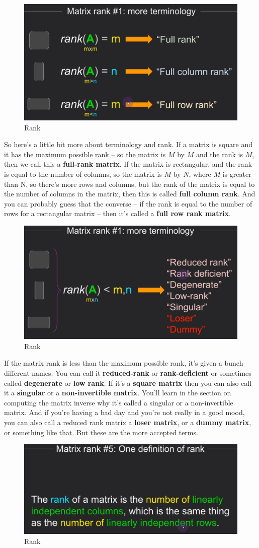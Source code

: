 \documentclass[fleqn,10pt]{olplainarticle}
\theoremstyle{definition}
\theoremstyle{remark}
\begin{document}
\pagebreak

\begin{figure}[ht]
	\centering
	\includegraphics[width=0.4\linewidth]{images/rank-09.png}
	\caption{Rank}
	\label{fig:rank_09}
\end{figure}

So here's a little bit more about terminology and rank. If a matrix is square and it has the maximum possible rank -- so the matrix is $M$ by $M$ and the rank is $M$, then we call this a \textbf{full-rank matrix}. If the matrix is rectangular, and the rank is equal to the number of columns, so the matrix is $M$ by $N$, where $M$ is greater than N, so there's more rows and columns, but the rank of the matrix is equal to the number of columns in the matrix, then this is called \textbf{full column rank}. And you can probably guess that the converse -- if the rank is equal to the number of rows for a rectangular matrix -- then it's called a \textbf{full row rank matrix}.

\begin{figure}[ht]
	\centering
	\includegraphics[width=0.3\linewidth]{images/rank-10.png}
	\caption{Rank}
	\label{fig:rank_10}
\end{figure}

If the matrix rank is less than the maximum possible rank, it's given a bunch different names. You can call it \textbf{reduced-rank} or \textbf{rank-deficient} or sometimes called \textbf{degenerate} or \textbf{low rank}. If it's a \textbf{square matrix} then you can also call it a \textbf{singular} or a \textbf{non-invertible matrix}. You'll learn in the section on computing the matrix inverse why it's called a singular or a non-invertible matrix. And if you're having a bad day and you're not really in a good mood, you can also call a reduced rank matrix a \textbf{loser matrix}, or a \textbf{dummy matrix}, or something like that. But these are the more accepted terms.

\begin{figure}[ht]
	\centering
	\includegraphics[width=0.3\linewidth]{images/rank-11.png}
	\caption{Rank}
	\label{fig:rank_11}
\end{figure}
\end{document}
